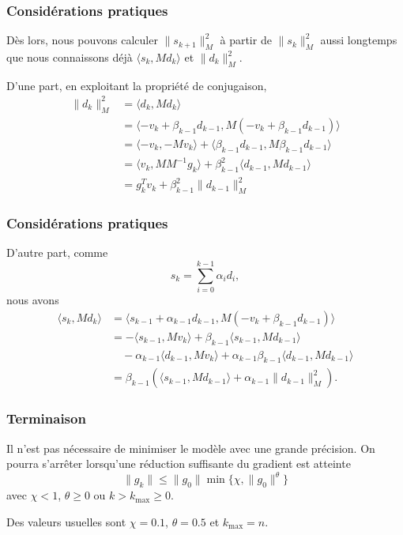 \documentclass[usepdftitle=false,aspectratio=169]{beamer}
\begin{document}
\begin{frame}
\frametitle{Considérations pratiques}

Dès lors, nous pouvons calculer $\| s_{k+1} \|_M^2$ à partir de $\| s_k \|_M^2$ aussi longtemps que nous connaissons déjà $\langle s_k, Md_k \rangle$ et $\| d_k \|_M^2$.

D'une part, en exploitant la propriété de conjugaison,
\begin{align*}
\| d_k \|_M^2 &= \langle d_k, Md_k \rangle \\
&= \langle -v_k + \beta_{k-1} d_{k-1}, M(-v_k + \beta_{k-1} d_{k-1}) \rangle \\
&= \langle -v_k, -Mv_k \rangle + \langle \beta_{k-1} d_{k-1}, M\beta_{k-1} d_{k-1} \rangle \\
&= \langle v_k, MM^{-1}g_k \rangle + \beta_{k-1}^2\langle  d_{k-1}, M d_{k-1} \rangle \\
&= g_k^Tv_k + \beta_{k-1}^2 \| d_{k-1} \|_M^2	
\end{align*}

\end{frame}

\begin{frame}
\frametitle{Considérations pratiques}

D'autre part, comme
$$
s_k = \sum_{i = 0}^{k-1} \alpha_i d_i,
$$
nous avons
\begin{align*}
\langle s_k, Md_k \rangle
&= \langle s_{k-1} + \alpha_{k-1}d_{k-1}, M(-v_k + \beta_{k-1} d_{k-1}) \rangle \\
&= -\langle s_{k-1}, Mv_k \rangle + \beta_{k-1} \langle s_{k-1}, Md_{k-1} \rangle \\
& \quad - \alpha_{k-1} \langle d_{k-1}, Mv_k \rangle + \alpha_{k-1} \beta_{k-1} \langle d_{k-1}, Md_{k-1} \rangle \\
&= \beta_{k-1} \left( \langle s_{k-1}, Md_{k-1} \rangle + \alpha_{k-1} \| d_{k-1} \|_M^2 \right).
\end{align*}

\end{frame}

\begin{frame}
\frametitle{Terminaison}

Il n'est pas nécessaire de minimiser le modèle avec une grande précision.
On pourra s'arrêter lorsqu'une réduction suffisante du gradient est atteinte
$$
\| g_k \| \leq \| g_0 \| \min \lbrace \chi, \| g_0 \|^{\theta} \rbrace
$$
avec $\chi < 1$, $\theta \geq 0$ ou
$k > k_{\max} \geq 0$.

\mbox{}

Des valeurs usuelles sont $\chi = 0.1$, $\theta = 0.5$ et $k_{\max} = n$.
\end{frame}
\end{document}
